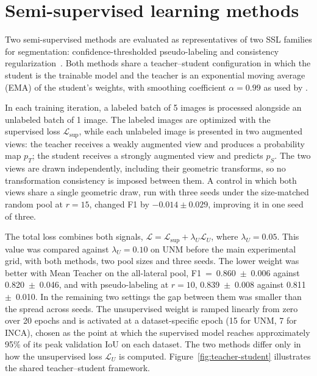 \documentclass[
  msc,
  american
]{ThesisPUC_v2}
\begin{document}
\section{Semi-supervised learning methods}
\label{sec:method-ssl}

Two semi-supervised methods are evaluated as representatives of two SSL families for segmentation: confidence-thresholded pseudo-labeling and consistency regularization~\citep{ref_ssl_survey}. Both methods share a teacher--student configuration in which the student is the trainable model and the teacher is an exponential moving average (EMA) of the student's weights, with smoothing coefficient $\alpha = 0.99$ as used by \citet{ref_mean_teacher}.

In each training iteration, a labeled batch of 5 images is processed alongside an unlabeled batch of 1 image. The labeled images are optimized with the supervised loss $\mathcal{L}_{\text{sup}}$, while each unlabeled image is presented in two augmented views: the teacher receives a weakly augmented view and produces a probability map $p_T$; the student receives a strongly augmented view and predicts $p_S$. The two views are drawn independently, including their geometric transforms, so no transformation consistency is imposed between them. A control in which both views share a single geometric draw, run with three seeds under the size-matched random pool at $r=15$, changed F1 by $-0.014 \pm 0.029$, improving it in one seed of three.

The total loss combines both signals, $\mathcal{L} = \mathcal{L}_{\text{sup}} + \lambda_U \mathcal{L}_U$, where $\lambda_U = 0.05$. This value was compared against $\lambda_U = 0.10$ on UNM before the main experimental grid, with both methods, two pool sizes and three seeds. The lower weight was better with Mean Teacher on the all-lateral pool, F1~=~0.860~$\pm$~0.006 against 0.820~$\pm$~0.046, and with pseudo-labeling at $r=10$, 0.839~$\pm$~0.008 against 0.811~$\pm$~0.010. In the remaining two settings the gap between them was smaller than the spread across seeds. The unsupervised weight is ramped linearly from zero over 20 epochs and is activated at a dataset-specific epoch (15 for UNM, 7 for INCA), chosen as the point at which the supervised model reaches approximately 95\% of its peak validation IoU on each dataset. The two methods differ only in how the unsupervised loss $\mathcal{L}_U$ is computed. Figure~\ref{fig:teacher-student} illustrates the shared teacher--student framework.
\end{document}
